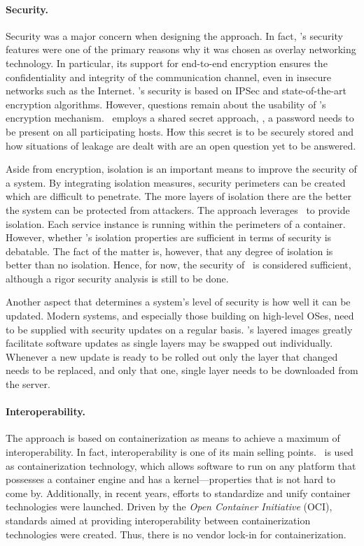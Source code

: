 \paragraph{Security.}
Security was a major concern when designing the approach. In fact, \weave 's security features were one of the primary reasons why it was chosen as overlay networking technology. In particular, its support for end-to-end encryption ensures the confidentiality and integrity of the communication channel, even in insecure networks such as the Internet. \wnet 's security is based on IPSec and state-of-the-art encryption algorithms. However, questions remain about the usability of \weave 's encryption mechanism. \weave\ employs a shared secret approach, \ie , a password needs to be present on all participating hosts. How this secret is to be securely stored and how situations of leakage are dealt with are an open question yet to be answered.

Aside from encryption, isolation is an important means to improve the security of a system. By integrating isolation measures, security perimeters can be created which are difficult to penetrate. The more layers of isolation there are the better the system can be protected from attackers. The approach leverages \docker\ to provide isolation. Each service instance is running within the perimeters of a container. However, whether \docker 's isolation properties are sufficient in terms of security is debatable. The fact of the matter is, however, that any degree of isolation is better than no isolation. Hence, for now, the security of \docker\ is considered sufficient, although a rigor security analysis is still to be done.

Another aspect that determines a system's level of security is how well it can be updated. Modern systems, and especially those building on high-level OSes, need to be supplied with security updates on a regular basis. \docker 's layered images greatly facilitate software updates as single layers may be swapped out individually. Whenever a new update is ready to be rolled out only the layer that changed needs to be replaced, and only that one, single layer needs to be downloaded from the server.


\paragraph{Interoperability.}
The approach is based on containerization as means to achieve a maximum of interoperability. In fact, interoperability is one of its main selling points. \docker\ is used as containerization technology, which allows software to run on any platform that possesses a container engine and has a kernel---properties that is not hard to come by. Additionally, in recent years, efforts to standardize and unify container technologies were launched. Driven by the \emph{Open Container Initiative} (OCI), standards aimed at providing interoperability between containerization technologies were created. Thus, there is no vendor lock-in for containerization.

